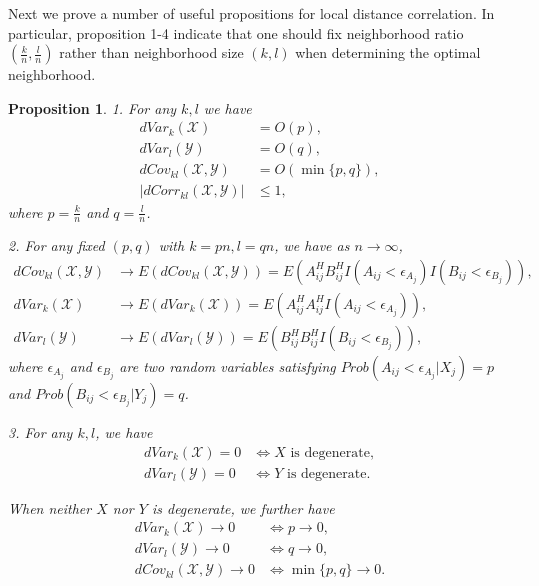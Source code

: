 \documentclass[12pt]{article}
\newtheorem{prop}{Proposition}
\begin{document}
Next we prove a number of useful propositions for local distance correlation. In particular, proposition 1-4 indicate that one should fix neighborhood ratio $(\frac{k}{n},\frac{l}{n})$ rather than neighborhood size $(k,l)$ when determining the optimal neighborhood.
\begin{prop}
\label{prop1}
1. For any $k,l$ we have
\begin{align*}
dVar_{k}(\mathcal{X}) &= O(p), \\
dVar_{l}(\mathcal{Y}) &= O(q), \\
dCov_{kl}(\mathcal{X},\mathcal{Y}) &= O(\min\{p,q\}), \\
|dCorr_{kl}(\mathcal{X},\mathcal{Y})| &\leq 1, 
\end{align*}
where $p=\frac{k}{n}$ and $q=\frac{l}{n}$. 

2.
For any fixed $(p,q)$ with $k=pn, l=qn$, we have as $n \rightarrow \infty$, 
\begin{align*}
dCov_{kl}(\mathcal{X},\mathcal{Y}) & \rightarrow E(dCov_{kl}(\mathcal{X},\mathcal{Y})) = E(A^{H}_{ij}B^{H}_{ij}I(A_{ij}< \epsilon_{A_{j}})I(B_{ij}< \epsilon_{B_{j}})), \\
dVar_{k}(\mathcal{X}) & \rightarrow E(dVar_{k}(\mathcal{X}))=E(A^{H}_{ij}A^{H}_{ij}I(A_{ij}< \epsilon_{A_{j}})), \\
dVar_{l}(\mathcal{Y}) & \rightarrow E(dVar_{l}(\mathcal{Y}))=E(B^{H}_{ij}B^{H}_{ij}I(B_{ij}< \epsilon_{B_{j}})),
\end{align*}
where $\epsilon_{A_{j}}$ and $\epsilon_{B_{j}}$ are two random variables satisfying $Prob(A_{ij}< \epsilon_{A_{j}} | X_{j})=p$ and $Prob(B_{ij}< \epsilon_{B_{j}} | Y_{j})=q$.

3. For any $k,l$, we have 
\begin{align*}
dVar_{k}(\mathcal{X})=0 &\Leftrightarrow X \mbox{ is degenerate}, \\
dVar_{l}(\mathcal{Y})=0 &\Leftrightarrow Y \mbox{ is degenerate}. 
\end{align*}

When neither $X$ nor $Y$ is degenerate, we further have 
\begin{align*}
dVar_{k}(\mathcal{X}) \rightarrow 0 &\Leftrightarrow p \rightarrow 0, \\
dVar_{l}(\mathcal{Y}) \rightarrow 0 &\Leftrightarrow q \rightarrow 0, \\
dCov_{kl}(\mathcal{X},\mathcal{Y}) \rightarrow 0 &\Leftrightarrow \min\{p,q\} \rightarrow 0.
\end{align*}


\end{prop}
\end{document}
